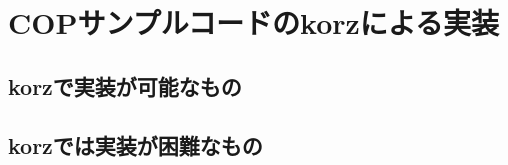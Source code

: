 \section{COPサンプルコードのkorzによる実装}\label{copux30b5ux30f3ux30d7ux30ebux30b3ux30fcux30c9ux306ekorzux306bux3088ux308bux5b9fux88c5}

\subsection{korzで実装が可能なもの}\label{korzux3067ux5b9fux88c5ux304cux53efux80fdux306aux3082ux306e}

\begin{Shaded}
\begin{Highlighting}[]

\end{Highlighting}
\end{Shaded}

\subsection{korzでは実装が困難なもの}\label{korzux3067ux306fux5b9fux88c5ux304cux56f0ux96e3ux306aux3082ux306e}

\section{}\label{section}

